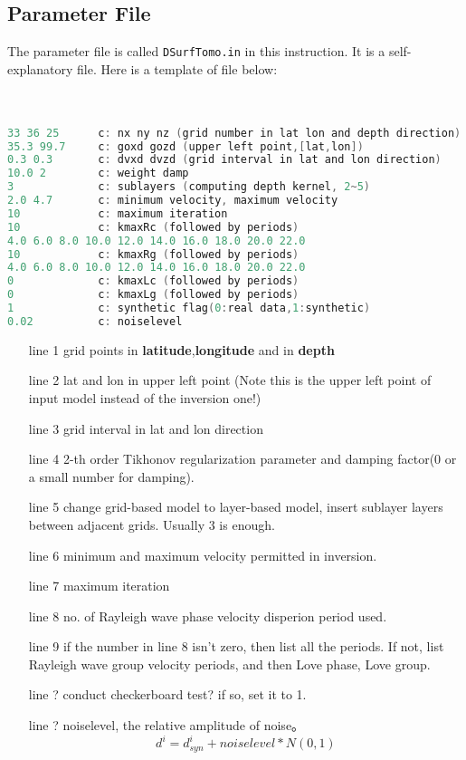\documentclass[UTF8]{article}
\begin{document}
    \subsection{Parameter File}
    The parameter file is called \verb!DSurfTomo.in! in this instruction. It is a self-explanatory file.
    Here is a template of file below: \\
    \\
    \\
\begin{lstlisting}[language=c]
33 36 25      c: nx ny nz (grid number in lat lon and depth direction)
35.3 99.7     c: goxd gozd (upper left point,[lat,lon])
0.3 0.3       c: dvxd dvzd (grid interval in lat and lon direction)
10.0 2        c: weight damp
3             c: sublayers (computing depth kernel, 2~5)
2.0 4.7       c: minimum velocity, maximum velocity
10            c: maximum iteration
10            c: kmaxRc (followed by periods)
4.0 6.0 8.0 10.0 12.0 14.0 16.0 18.0 20.0 22.0 
10            c: kmaxRg (followed by periods)
4.0 6.0 8.0 10.0 12.0 14.0 16.0 18.0 20.0 22.0 
0             c: kmaxLc (followed by periods)
0             c: kmaxLg (followed by periods)
1             c: synthetic flag(0:real data,1:synthetic)
0.02          c: noiselevel
\end{lstlisting}
    \begin{enumerate}
        \item [line 1] grid points in \textbf{latitude},\textbf{longitude}
                    and in \textbf{depth}
        \item[line 2] lat and lon in upper left point (Note this is the upper left point of input 
                    model instead of the inversion one!)
        \item[line 3] grid interval in lat and lon direction 
        \item[line 4] 2-th order Tikhonov regularization parameter and damping factor(0 or a small number for damping).
        \item[line 5] change grid-based model to layer-based model, insert sublayer layers between 
                      adjacent grids. Usually 3 is enough. 
        \item[line 6] minimum and maximum velocity permitted in inversion.
        \item[line 7] maximum iteration
        \item[line 8] no. of Rayleigh wave phase velocity disperion period used.
        \item[line 9] if the number in line 8 isn't zero, then list all the periods. If not,
                      list Rayleigh wave group velocity periods, and then Love phase, Love group.
        \item[line ?] conduct checkerboard test? if so, set it to 1.
        \item[line ?]  noiselevel, the relative amplitude of noise。
        \[   
            d^i = d_{syn}^i +  noiselevel * N(0,1)
         \]
    \end{enumerate}
\end{document}
